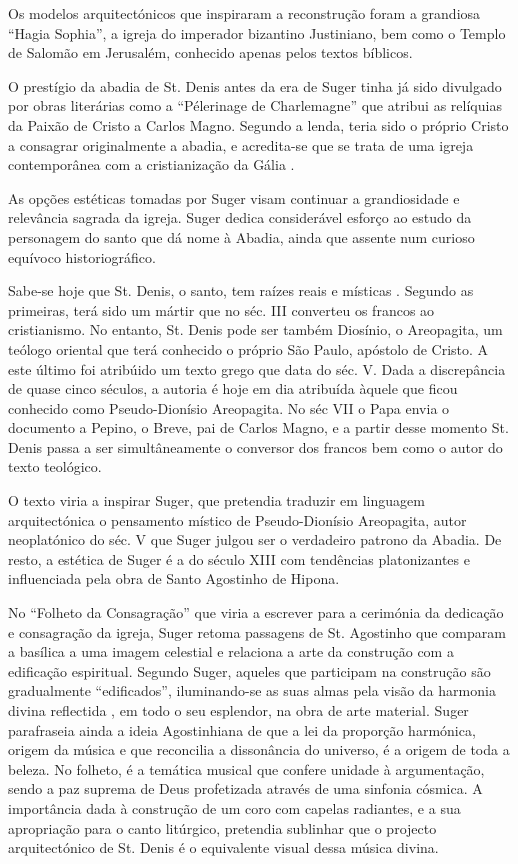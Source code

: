 \documentclass{article}
\begin{document}
Os modelos arquitectónicos que inspiraram a reconstrução foram a
grandiosa ``Hagia Sophia'', a igreja do imperador bizantino
Justiniano, bem como o Templo de Salomão em Jerusalém, conhecido
apenas pelos textos bíblicos.

O prestígio da abadia de St. Denis antes da era de Suger tinha já sido
divulgado por obras literárias como a ``Pélerinage de Charlemagne''
que atribui as relíquias da Paixão de Cristo a Carlos Magno. Segundo a
lenda, teria sido o próprio Cristo a consagrar originalmente a abadia,
e acredita-se que se trata de uma igreja contemporânea com a
cristianização da Gália \cite{wiki-abadia}. 

As opções estéticas tomadas por Suger visam continuar a grandiosidade
e relevância sagrada da igreja. Suger dedica considerável esforço ao
estudo da personagem do santo que dá nome à Abadia, ainda que assente
num curioso equívoco historiográfico.

Sabe-se hoje que St. Denis, o santo, tem raízes reais e místicas
\cite{calado}. Segundo as primeiras, terá sido um mártir que no
séc. III converteu os francos ao cristianismo. No entanto, St. Denis
pode ser também Diosínio, o Areopagita, um teólogo oriental que terá
conhecido o próprio São Paulo, apóstolo de Cristo. A este último foi
atribúido um texto grego que data do séc. V. Dada a discrepância de
quase cinco séculos, a autoria é hoje em dia atribuída àquele que
ficou conhecido como Pseudo-Dionísio Areopagita. No séc VII o Papa
envia o documento a Pepino, o Breve, pai de Carlos Magno, e a partir
desse momento St. Denis passa a ser simultâneamente o conversor dos
francos bem como o autor do texto teológico.

O texto viria a inspirar Suger, que pretendia traduzir em linguagem
arquitectónica o pensamento místico de Pseudo-Dionísio Areopagita,
autor neoplatónico do séc. V que Suger julgou ser o verdadeiro patrono
da Abadia. De resto, a estética de Suger é a do século XIII com
tendências platonizantes e influenciada pela obra de Santo Agostinho
de Hipona.

No ``Folheto da Consagração'' que viria a escrever para a cerimónia da
dedicação e consagração da igreja, Suger retoma passagens de
St. Agostinho que comparam a basílica a uma imagem celestial e
relaciona a arte da construção com a edificação espiritual. Segundo
Suger, aqueles que participam na construção são gradualmente
``edificados'', iluminando-se as suas almas pela visão da harmonia
divina reflectida , em todo o seu esplendor, na obra de arte
material. Suger parafraseia ainda a ideia Agostinhiana de que a lei da
proporção harmónica, origem da música e que reconcilia a dissonância
do universo, é a origem de toda a beleza. No folheto, é a temática
musical que confere unidade à argumentação, sendo a paz suprema de
Deus profetizada através de uma sinfonia cósmica. A importância dada à
construção de um coro com capelas radiantes, e a sua apropriação para
o canto litúrgico, pretendia sublinhar que o projecto arquitectónico
de St. Denis é o equivalente visual dessa música divina.
\end{document}
